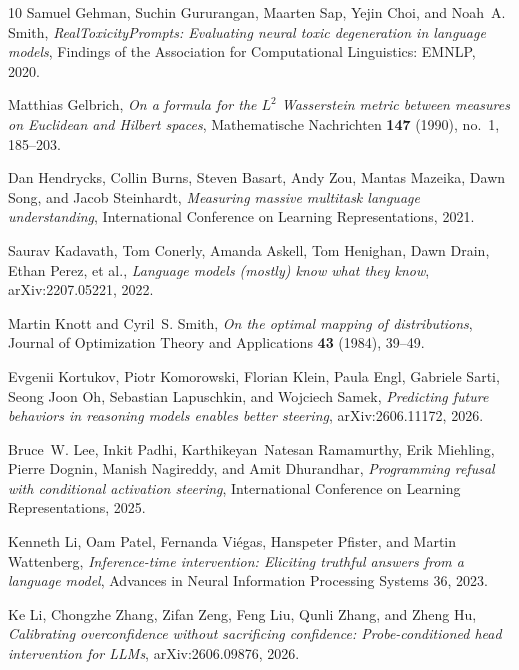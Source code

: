 \documentclass{article}
\begin{document}
\begin{thebibliography}{10}
Samuel Gehman, Suchin Gururangan, Maarten Sap, Yejin Choi, and Noah~A. Smith,
  \emph{RealToxicityPrompts: Evaluating neural toxic degeneration in language
  models}, Findings of the Association for Computational Linguistics: EMNLP, 2020.

Matthias Gelbrich, \emph{On a formula for the $L^2$ Wasserstein metric between
  measures on Euclidean and Hilbert spaces}, Mathematische Nachrichten
  \textbf{147} (1990), no.~1, 185--203.

Dan Hendrycks, Collin Burns, Steven Basart, Andy Zou, Mantas Mazeika, Dawn Song,
  and Jacob Steinhardt, \emph{Measuring massive multitask language
  understanding}, International Conference on Learning Representations, 2021.

Saurav Kadavath, Tom Conerly, Amanda Askell, Tom Henighan, Dawn Drain, Ethan
  Perez, et al., \emph{Language models (mostly) know what they know},
  arXiv:2207.05221, 2022.

Martin Knott and Cyril~S. Smith, \emph{On the optimal mapping of distributions},
  Journal of Optimization Theory and Applications \textbf{43} (1984), 39--49.

Evgenii Kortukov, Piotr Komorowski, Florian Klein, Paula Engl, Gabriele Sarti,
  Seong Joon Oh, Sebastian Lapuschkin, and Wojciech Samek, \emph{Predicting
  future behaviors in reasoning models enables better steering},
  arXiv:2606.11172, 2026.

Bruce~W. Lee, Inkit Padhi, Karthikeyan~Natesan Ramamurthy, Erik Miehling,
  Pierre Dognin, Manish Nagireddy, and Amit Dhurandhar, \emph{Programming
  refusal with conditional activation steering}, International Conference on
  Learning Representations, 2025.

Kenneth Li, Oam Patel, Fernanda Vi\'egas, Hanspeter Pfister, and Martin
  Wattenberg, \emph{Inference-time intervention: Eliciting truthful answers from
  a language model}, Advances in Neural Information Processing Systems 36, 2023.

Ke Li, Chongzhe Zhang, Zifan Zeng, Feng Liu, Qunli Zhang, and Zheng Hu,
  \emph{Calibrating overconfidence without sacrificing confidence:
  Probe-conditioned head intervention for LLMs}, arXiv:2606.09876, 2026.


\end{thebibliography}
\end{document}
